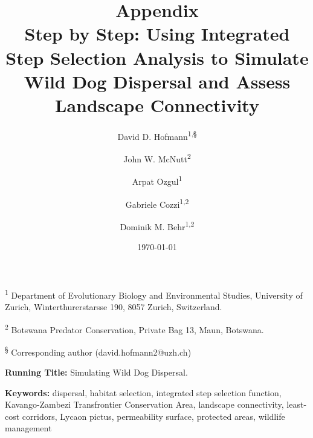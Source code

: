 \documentclass[abstract=off,10pt,a4paper,bibliography=totocnumbered]{article}
\title{\textbf{Appendix}\\ Step by Step: Using Integrated Step Selection
Analysis to Simulate Wild Dog Dispersal and Assess Landscape Connectivity}
\author{
  David D. Hofmann\textsuperscript{1,\S} \and
  John W. McNutt\textsuperscript{2} \and
  Arpat Ozgul\textsuperscript{1} \and
  Gabriele Cozzi\textsuperscript{1,2} \and
  Dominik M. Behr\textsuperscript{1,2}
}
\date{\today}
\newcommand{\beginappendix}{%
  \setcounter{table}{0}
  \renewcommand{\thetable}{S\arabic{table}}%
  \setcounter{figure}{0}
  \renewcommand{\thefigure}{S\arabic{figure}}%
  \setcounter{equation}{0}
  \renewcommand{\theequation}{Equation S\arabic{equation}}%
  \setcounter{section}{0}
  \renewcommand{\thesection}{A.\arabic{section}}%
}
\begin{document}



\maketitle

\begin{flushleft}

\vspace{0.5cm}

\textsuperscript{1} Department of Evolutionary Biology and Environmental
Studies, University of Zurich, Winterthurerstarsse 190, 8057 Zurich,
Switzerland.

\textsuperscript{2} Botswana Predator Conservation, Private Bag 13, Maun,
Botswana.

\textsuperscript{\S} Corresponding author (david.hofmann2@uzh.ch)

\vspace{4cm}

\textbf{Running Title:} Simulating Wild Dog Dispersal.

\vspace{0.5cm}

\textbf{Keywords:} dispersal, habitat selection, integrated step selection
function, Kavango-Zambezi Transfrontier Conservation Area, landscape
connectivity, least-cost corridors, Lycaon pictus, permeability surface,
protected areas, wildlife management

\end{flushleft}

\newpage



\appendix
\beginappendix

\end{document}
